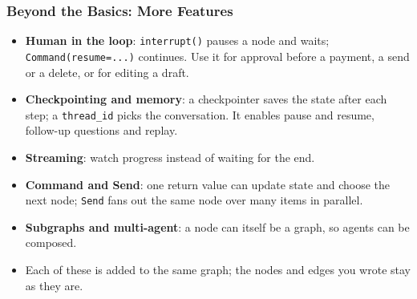 
\begin{frame}[fragile]\frametitle{Beyond the Basics: More Features}
      \begin{itemize}
        \item \textbf{Human in the loop}: \texttt{interrupt()} pauses a node and waits; \texttt{Command(resume=...)} continues. Use it for approval before a payment, a send or a delete, or for editing a draft.
        \item \textbf{Checkpointing and memory}: a checkpointer saves the state after each step; a \texttt{thread\_id} picks the conversation. It enables pause and resume, follow-up questions and replay.
        \item \textbf{Streaming}: watch progress instead of waiting for the end.
        \item \textbf{Command and Send}: one return value can update state and choose the next node; \texttt{Send} fans out the same node over many items in parallel.
        \item \textbf{Subgraphs and multi-agent}: a node can itself be a graph, so agents can be composed.
        \item Each of these is added to the same graph; the nodes and edges you wrote stay as they are.
      \end{itemize}
\end{frame}

